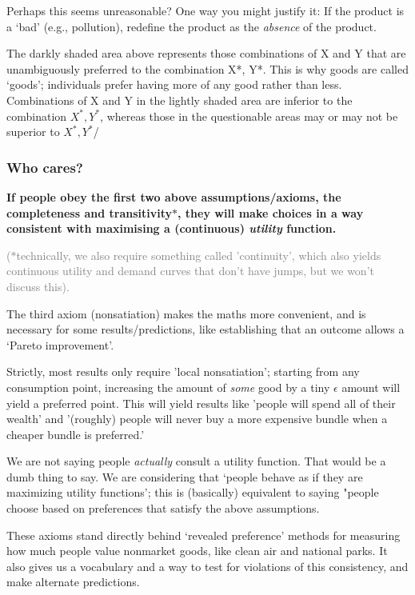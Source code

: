 \documentclass[]{article}
\begin{document}
Perhaps this seems unreasonable? One way you might justify it: If the product is a `bad' (e.g., pollution), redefine the product as the \emph{absence} of the product.

The darkly shaded area above represents those combinations of X and Y that are unambiguously preferred to the combination X*, Y*.
This is why goods are called `goods'; individuals prefer having more of any good rather than less.
Combinations of X and Y in the lightly shaded area are inferior to the combination \(X^{\ast}, Y^{\ast}\),
whereas those in the questionable areas may or may not be superior to \(X^{\ast}, Y^{\ast}\)/

\hypertarget{who-cares}{%
\subsubsection{Who cares?}\label{who-cares}}

\textbf{If people obey the first two above assumptions/axioms, the completeness and transitivity\(\ast\), they will make choices in a way consistent with maximising a (continuous) \emph{utility} function.}

\textcolor{gray}{($\ast$technically, we also require something called 'continuity', which also yields continuous utility and demand curves that don't have jumps,  but we won't discuss this).}

The third axiom (nonsatiation) makes the maths more convenient, and is necessary for some results/predictions, like establishing that an outcome allows a `Pareto improvement'.

\textcolor{RawSienna}{Strictly, most results only require 'local nonsatiation'; starting from any consumption point, increasing the amount of \emph{some} good by a tiny $\epsilon$ amount will yield a preferred point. This will yield results like 'people will spend all of their wealth' and '(roughly) people will never buy a more expensive bundle when a cheaper bundle is preferred.'}

We are not saying people \emph{actually} consult a utility function. That would be a dumb thing to say.
We are considering that `people behave as if they are maximizing utility functions';
this is (basically) equivalent to saying "people choose based on preferences that satisfy the above assumptions.

These axioms stand directly behind `revealed preference' methods for measuring how much people value
nonmarket goods, like clean air and national parks.
It also gives us a vocabulary and a way to test for violations of this consistency, and make alternate predictions.
\end{document}
